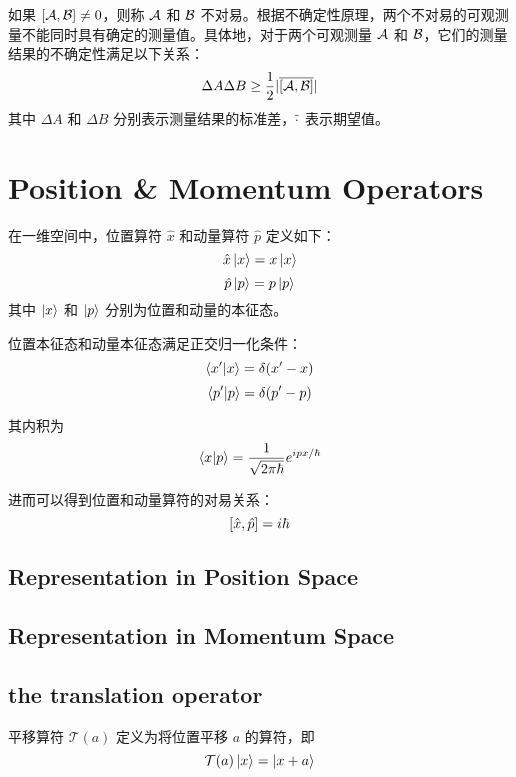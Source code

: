 如果 $\left[\mathcal{A},\mathcal{B}\right] \neq 0$，则称 $\mathcal{A}$ 和 $\mathcal{B}$ 不对易。根据不确定性原理，两个不对易的可观测量不能同时具有确定的测量值。具体地，对于两个可观测量 $\mathcal{A}$ 和 $\mathcal{B}$，它们的测量结果的不确定性满足以下关系：
\begin{equation}
    \Delta A \Delta B \geq \frac{1}{2} |\overline{\left[\mathcal{A},\mathcal{B}\right]}|
\end{equation}
其中 $\Delta A$ 和 $\Delta B$ 分别表示测量结果的标准差，$\overline{\cdot}$ 表示期望值。

\section{Position \& Momentum Operators}
在一维空间中，位置算符 $\hat{x}$ 和动量算符 $\hat{p}$ 定义如下：
\begin{equation}
    \hat{x}\left|x\right> = x\left|x\right>
\end{equation}
\begin{equation}
    \hat{p}\left|p\right> = p\left|p\right>
\end{equation}
其中 $\left|x\right>$ 和 $\left|p\right>$ 分别为位置和动量的本征态。

位置本征态和动量本征态满足正交归一化条件：
\begin{equation}
    \left<x'\middle|x\right> = \delta(x' - x)
\end{equation}
\begin{equation}
    \left<p'\middle|p\right> = \delta(p' - p)
\end{equation}

其内积为
\begin{equation}
    \left<x\middle|p\right> = \frac{1}{\sqrt{2\pi\hbar}} e^{ipx/\hbar}
\end{equation}

进而可以得到位置和动量算符的对易关系：
\begin{equation}
    \left[\hat{x},\hat{p}\right] = i\hbar
\end{equation}

\subsection{Representation in Position Space}

\subsection{Representation in Momentum Space}

\subsection{the translation operator}
平移算符 $\mathscr{T}(a)$ 定义为将位置平移 $a$ 的算符，即
\begin{equation}
    \mathcal{T}(a)\left|x\right> = \left|x + a\right>
\end{equation}